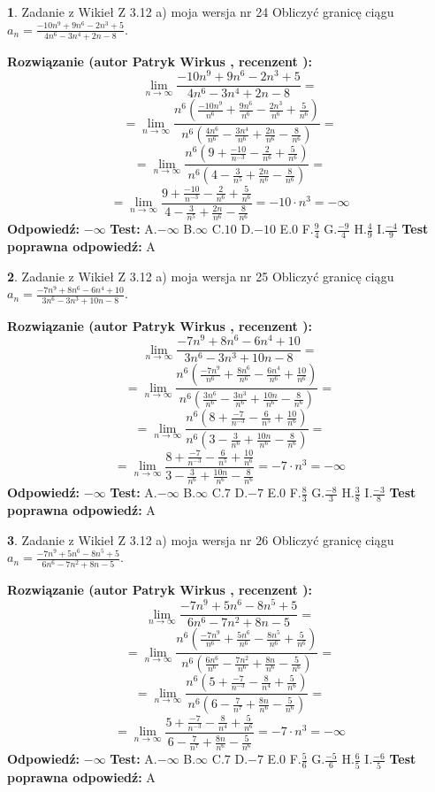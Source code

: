 \documentclass[12pt, a4paper]{article}
\theoremstyle{definition} %
\newtheorem{zad}{}
\newcommand{\zadStart}[1]{\begin{zad}#1\newline}
\newcommand{\zadStop}{\end{zad}}
\newcommand{\rozwStart}[2]{\noindent \textbf{Rozwiązanie (autor #1 , recenzent #2): }\newline}
\newcommand{\rozwStop}{\newline}
\newcommand{\odpStart}{\noindent \textbf{Odpowiedź:}\newline}
\newcommand{\odpStop}{\newline}
\newcommand{\testStart}{\noindent \textbf{Test:}\newline}
\newcommand{\testStop}{\newline}
\newcommand{\kluczStart}{\noindent \textbf{Test poprawna odpowiedź:}\newline}
\newcommand{\kluczStop}{\newline}
\begin{document}
\zadStart{Zadanie z Wikieł Z 3.12 a) moja wersja nr 24}
Obliczyć granicę ciągu $a_{n}=\frac{-10n^{9}+9n^{6}-2n^{3}+5}{4n^{6}-3n^{4}+2n-8}$.
\zadStop
\rozwStart{Patryk Wirkus}{}
$$\lim\limits_{n\to\infty}\frac{-10n^{9}+9n^{6}-2n^{3}+5}{4n^{6}-3n^{4}+2n-8}=$$
$$=\lim\limits_{n\to\infty}\frac{n^{6}\left(\frac{-10n^{9}}{n^{6}}+\frac{9n^{6}}{n^{6}}-\frac{2n^{3}}{n^{6}}+\frac{5}{n^{6}}\right)}{n^{6}\left(\frac{4n^{6}}{n^{6}}-\frac{3n^{4}}{n^{6}}+\frac{2n}{n^{6}}-\frac{8}{n^{6}}\right)}=$$
$$=\lim\limits_{n\to\infty}\frac{n^{6}\left(9+\frac{-10}{n^{-3}}-\frac{2}{n^{6}}+\frac{5}{n^{6}}\right)}
{n^{6}\left(4-\frac{3}{n^{5}}+\frac{2n}{n^{6}}-\frac{8}{n^{6}}\right)}=$$
$$=\lim\limits_{n\to\infty}\frac{9+\frac{-10}{n^{-3}}-\frac{2}{n^{6}}+\frac{5}{n^{6}}}{4-\frac{3}{n^{5}}+\frac{2n}{n^{6}}-\frac{8}{n^{6}}}=-10\cdot n^{3} = -\infty$$
\rozwStop
\odpStart
$-\infty$
\odpStop
\testStart
A.$-\infty$
B.$\infty$
C.$10$
D.$-10$
E.$0$
F.$\frac{9}{4}$
G.$\frac{-9}{4}$
H.$\frac{4}{9}$
I.$\frac{-4}{9}$
\testStop
\kluczStart
A
\kluczStop



\zadStart{Zadanie z Wikieł Z 3.12 a) moja wersja nr 25}
Obliczyć granicę ciągu $a_{n}=\frac{-7n^{9}+8n^{6}-6n^{4}+10}{3n^{6}-3n^{3}+10n-8}$.
\zadStop
\rozwStart{Patryk Wirkus}{}
$$\lim\limits_{n\to\infty}\frac{-7n^{9}+8n^{6}-6n^{4}+10}{3n^{6}-3n^{3}+10n-8}=$$
$$=\lim\limits_{n\to\infty}\frac{n^{6}\left(\frac{-7n^{9}}{n^{6}}+\frac{8n^{6}}{n^{6}}-\frac{6n^{4}}{n^{6}}+\frac{10}{n^{6}}\right)}{n^{6}\left(\frac{3n^{6}}{n^{6}}-\frac{3n^{3}}{n^{6}}+\frac{10n}{n^{6}}-\frac{8}{n^{6}}\right)}=$$
$$=\lim\limits_{n\to\infty}\frac{n^{6}\left(8+\frac{-7}{n^{-3}}-\frac{6}{n^{5}}+\frac{10}{n^{6}}\right)}
{n^{6}\left(3-\frac{3}{n^{6}}+\frac{10n}{n^{6}}-\frac{8}{n^{6}}\right)}=$$
$$=\lim\limits_{n\to\infty}\frac{8+\frac{-7}{n^{-3}}-\frac{6}{n^{5}}+\frac{10}{n^{6}}}{3-\frac{3}{n^{6}}+\frac{10n}{n^{6}}-\frac{8}{n^{6}}}=-7\cdot n^{3} = -\infty$$
\rozwStop
\odpStart
$-\infty$
\odpStop
\testStart
A.$-\infty$
B.$\infty$
C.$7$
D.$-7$
E.$0$
F.$\frac{8}{3}$
G.$\frac{-8}{3}$
H.$\frac{3}{8}$
I.$\frac{-3}{8}$
\testStop
\kluczStart
A
\kluczStop



\zadStart{Zadanie z Wikieł Z 3.12 a) moja wersja nr 26}
Obliczyć granicę ciągu $a_{n}=\frac{-7n^{9}+5n^{6}-8n^{5}+5}{6n^{6}-7n^{2}+8n-5}$.
\zadStop
\rozwStart{Patryk Wirkus}{}
$$\lim\limits_{n\to\infty}\frac{-7n^{9}+5n^{6}-8n^{5}+5}{6n^{6}-7n^{2}+8n-5}=$$
$$=\lim\limits_{n\to\infty}\frac{n^{6}\left(\frac{-7n^{9}}{n^{6}}+\frac{5n^{6}}{n^{6}}-\frac{8n^{5}}{n^{6}}+\frac{5}{n^{6}}\right)}{n^{6}\left(\frac{6n^{6}}{n^{6}}-\frac{7n^{2}}{n^{6}}+\frac{8n}{n^{6}}-\frac{5}{n^{6}}\right)}=$$
$$=\lim\limits_{n\to\infty}\frac{n^{6}\left(5+\frac{-7}{n^{-3}}-\frac{8}{n^{4}}+\frac{5}{n^{6}}\right)}
{n^{6}\left(6-\frac{7}{n^{7}}+\frac{8n}{n^{6}}-\frac{5}{n^{6}}\right)}=$$
$$=\lim\limits_{n\to\infty}\frac{5+\frac{-7}{n^{-3}}-\frac{8}{n^{4}}+\frac{5}{n^{6}}}{6-\frac{7}{n^{7}}+\frac{8n}{n^{6}}-\frac{5}{n^{6}}}=-7\cdot n^{3} = -\infty$$
\rozwStop
\odpStart
$-\infty$
\odpStop
\testStart
A.$-\infty$
B.$\infty$
C.$7$
D.$-7$
E.$0$
F.$\frac{5}{6}$
G.$\frac{-5}{6}$
H.$\frac{6}{5}$
I.$\frac{-6}{5}$
\testStop
\kluczStart
A
\kluczStop
\end{document}
